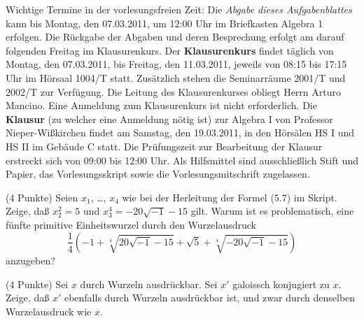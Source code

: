 \documentclass{algsheet}
\author{Dipl.-Math.~Franz Vogler}
\date{08.~Februar 2011}
\begin{document}
                \maketitle


Wichtige Termine in der vorlesungsfreien Zeit:
 \newline
Die \emph{Abgabe dieses Aufgabenblattes} kann bis Montag, den 07.03.2011, um 12:00 Uhr im Briefkasten 
\glqq Algebra 1\grqq \; erfolgen. Die Rückgabe der Abgaben und deren Besprechung erfolgt am darauf folgenden Freitag 
im Klausurenkurs.
\newline 
Der \textbf{Klausurenkurs} findet täglich von Montag, den 07.03.2011, bis Freitag, den 11.03.2011, 
jeweils von 08:15 bis 17:15 Uhr im Hörsaal 1004/T statt. Zusätzlich stehen die Seminarräume 2001/T
und 2002/T zur Verfügung. Die Leitung des Klausurenkurses obliegt Herrn Arturo Mancino. Eine Anmeldung zum Klausurenkurs ist
nicht erforderlich. 
\newline
Die \textbf{Klausur} (zu welcher eine Anmeldung nötig ist) zur Algebra I von Professor Nieper-Wißkirchen findet am Samstag, den 
19.03.2011, in den Hörsälen HS I und HS II im Gebäude C statt. Die Prüfungszeit zur Bearbeitung der Klausur  
erstreckt sich von 09:00 bis 12:00 Uhr. Als Hilfsmittel sind ausschließlich Stift und Papier, das Vorlesungsskript sowie die 
Vorlesungsmitschrift zugelassen. 



\begin{exercise}(4 Punkte)\newline
    Seien \(x_1\), \dots, \(x_4\) wie bei der Herleitung der Formel (5.7) im Skript.
    Zeige, daß \(x_2^2 = 5\) und \(x_3^4 = -20 \sqrt{-1} - 15\) gilt. Warum ist es problematisch,
    eine fünfte primitive Einheitswurzel durch den Wurzelausdruck
    \begin{equation}
        \frac 1 4 \left(-1 + \sqrt[4]{20 \sqrt{-1} - 15} + \sqrt{5} + \sqrt[4]{-20 \sqrt{-1} - 15}\right)
    \end{equation}
    anzugeben?
\end{exercise}


\begin{exercise}(4 Punkte)\newline
    Sei \(x\) durch Wurzeln ausdrückbar. Sei \(x'\) galoissch konjugiert zu \(x\).
    Zeige, daß \(x'\) ebenfalls durch Wurzeln ausdrückbar ist, und zwar durch
    denselben Wurzelausdruck wie \(x\).
\end{exercise}
\end{document}
